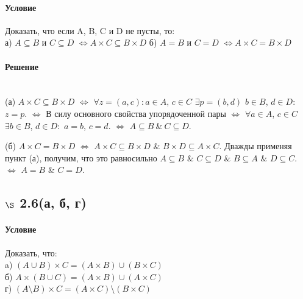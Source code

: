 \documentclass[a4paper,12pt]{article}
\begin{document}
\paragraph*{Условие}
Доказать, что если A, B, C и D не пусты, то:\\
а) $A \subseteq B$ и $ C \subseteq D $ $\Leftrightarrow A \times C \subseteq B \times D$
б) $A = B$ и $ C = D $ $\Leftrightarrow A \times C = B \times D$
\paragraph*{Решение} \mbox{}\\
(а) $A\times C \subseteq B\times D$ $\Leftrightarrow$ $\forall z=(a,c): a\in A$, $c\in C$ $\exists p=(b,d)$ $b\in B$, $d\in D:$ $z=p$. $\Leftrightarrow$ В силу основного свойства упорядоченной пары $\Leftrightarrow$ $\forall a\in A$, $c\in C$ $\exists b\in B$, $d\in D:$ $a=b$, $c=d$. $\Leftrightarrow$ $A \subseteq B \ \& \ C\subseteq D$.

\medskip

(б) $A\times C = B\times D$ $\Leftrightarrow$ $A\times C \subseteq B\times D$ $\&$ $B\times D \subseteq A\times C$. Дважды применяя пункт (а), получим, что это равносильно $A\subseteq B$ $\&$ $C\subseteq D$ $\&$ $B \subseteq A$ $\&$ $D\subseteq C$. $\Leftrightarrow$ $A=B$ $\&$ $C=D$.

\subsection*{$\S$ 2.6(а, б, г)}
\paragraph*{Условие}
Доказать, что:\\
a) $ ( A \cup B ) \times C = ( A \times B ) \cup ( B \times C ) $\\
б) $ A \times ( B \cup C ) = ( A \times B ) \cup ( A \times C ) $\\
г) $ ( A \setminus B ) \times C = ( A \times C ) \setminus ( B \times C ) $
\end{document}

